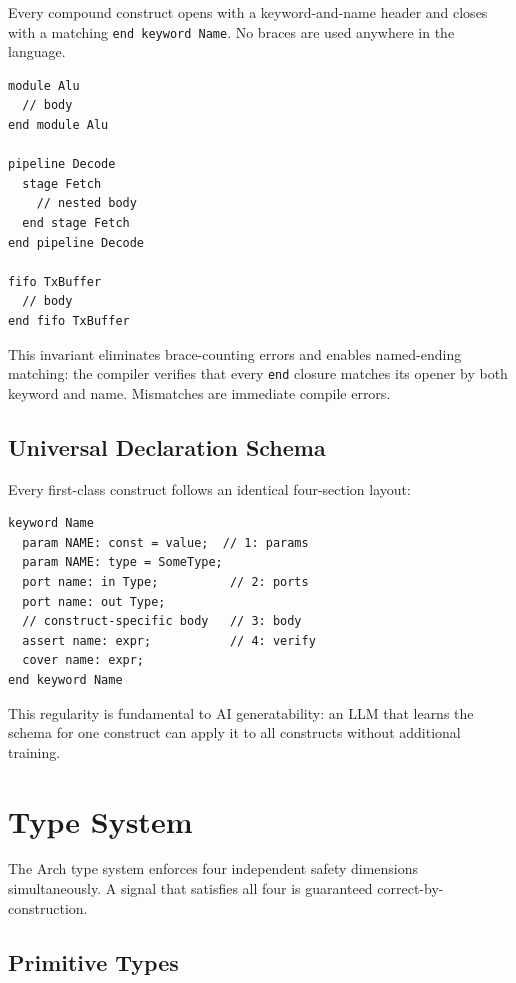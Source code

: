 \documentclass[11pt,twocolumn]{article}
\begin{document}
Every compound construct opens with a keyword-and-name header and closes with a matching \texttt{end keyword Name}. No braces are used anywhere in the language.

\begin{lstlisting}[language=Arch,caption={Universal block grammar},label={lst:block}]
module Alu
  // body
end module Alu

pipeline Decode
  stage Fetch
    // nested body
  end stage Fetch
end pipeline Decode

fifo TxBuffer
  // body
end fifo TxBuffer
\end{lstlisting}

This invariant eliminates brace-counting errors and enables named-ending matching: the compiler verifies that every \texttt{end} closure matches its opener by both keyword and name. Mismatches are immediate compile errors.

\subsection{Universal Declaration Schema}

Every first-class construct follows an identical four-section layout:

\begin{lstlisting}[language=Arch,caption={Universal schema},label={lst:schema}]
keyword Name
  param NAME: const = value;  // 1: params
  param NAME: type = SomeType;
  port name: in Type;          // 2: ports
  port name: out Type;
  // construct-specific body   // 3: body
  assert name: expr;           // 4: verify
  cover name: expr;
end keyword Name
\end{lstlisting}

This regularity is fundamental to AI generatability: an LLM that learns the schema for one construct can apply it to all constructs without additional training.

\section{Type System}\label{sec:types}

The Arch type system enforces four independent safety dimensions simultaneously. A signal that satisfies all four is guaranteed correct-by-construction.

\subsection{Primitive Types}
\end{document}
